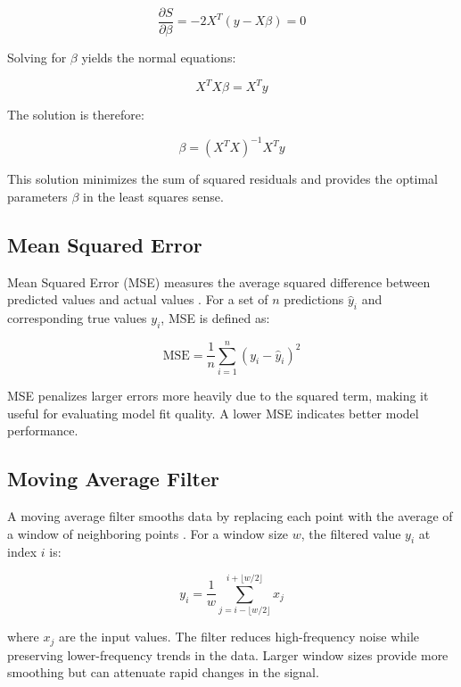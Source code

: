 \begin{equation}
\label{eq:derivative_residuals}
\frac{\partial S}{\partial \beta} = -2X^T(y - X\beta) = 0
\end{equation}

Solving for \(\beta\) yields the normal equations:

\begin{equation}
\label{eq:normal_equations}
X^TX\beta = X^Ty
\end{equation}

The solution is therefore:

\begin{equation}
\label{eq:least_squares_solution}
\beta = (X^TX)^{-1}X^Ty
\end{equation}

This solution minimizes the sum of squared residuals and provides the optimal parameters \(\beta\) in the least squares sense.

\subsection{Mean Squared Error}
Mean Squared Error (MSE) measures the average squared difference between predicted values and actual values \cite{numerical_methods}. For a set of \(n\) predictions \(\hat{y}_i\) and corresponding true values \(y_i\), MSE is defined as:

\begin{equation}
\label{eq:mse}
\text{MSE} = \frac{1}{n}\sum_{i=1}^n (y_i - \hat{y}_i)^2
\end{equation}

MSE penalizes larger errors more heavily due to the squared term, making it useful for evaluating model fit quality. A lower MSE indicates better model performance.


\subsection{Moving Average Filter}
A moving average filter smooths data by replacing each point with the average of a window of neighboring points \cite{signal_processing}. For a window size \(w\), the filtered value \(y_i\) at index \(i\) is:

\begin{equation}
\label{eq:moving_average}
y_i = \frac{1}{w}\sum_{j=i-\lfloor w/2 \rfloor}^{i+\lfloor w/2 \rfloor} x_j
\end{equation}

where \(x_j\) are the input values. The filter reduces high-frequency noise while preserving lower-frequency trends in the data. Larger window sizes provide more smoothing but can attenuate rapid changes in the signal.

